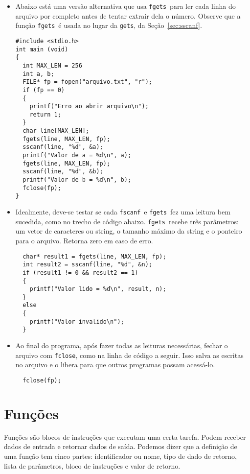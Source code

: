 \documentclass{book}
\newcommand{\FSCANF}{{\tt fscanf}}
\newcommand{\GETS}{{\tt gets}}
\newcommand{\FGETS}{{\tt fgets}}
\newcommand{\FCLOSE}{{\tt fclose}}
\begin{document}
\begin{itemize}
\item Abaixo está uma versão alternativa que usa \FGETS\ para ler cada linha do arquivo por completo antes de tentar extrair dela o número. Observe que a função \FGETS\ é usada no lugar da \GETS, da Seção~\ref{sec:sscanf}. \

\begin{lstlisting}
#include <stdio.h> 
int main (void)
{
  int MAX_LEN = 256
  int a, b;
  FILE* fp = fopen("arquivo.txt", "r");
  if (fp == 0)
  {
    printf("Erro ao abrir arquivo\n");
    return 1;
  }
  char line[MAX_LEN];
  fgets(line, MAX_LEN, fp);
  sscanf(line, "%d", &a);
  printf("Valor de a = %d\n", a);
  fgets(line, MAX_LEN, fp);
  sscanf(line, "%d", &b);
  printf("Valor de b = %d\n", b);
  fclose(fp);
}
\end{lstlisting}


\item Idealmente, deve-se testar se cada \FSCANF\ e \FGETS\ fez uma leitura bem sucedida, como no trecho de código abaixo. \FGETS\ recebe três parâmetros: um vetor de caracteres ou string, o tamanho máximo da string e o ponteiro para o arquivo. Retorna zero em caso de erro.

\begin{lstlisting}
  char* result1 = fgets(line, MAX_LEN, fp);
  int result2 = sscanf(line, "%d", &n);
  if (result1 != 0 && result2 == 1)
  {
    printf("Valor lido = %d\n", result, n);
  }
  else
  {
    printf("Valor invalido\n");
  }
\end{lstlisting}

\item Ao final do programa, após fazer todas as leituras necessárias, fechar o arquivo com \FCLOSE, como na linha de código a seguir. Isso salva as escritas no arquivo e o libera para que outros programas possam acessá-lo.

\begin{lstlisting}
  fclose(fp);
\end{lstlisting}

\end{itemize}



\chapter{Funções}

Funções são blocos de instruções que executam uma certa tarefa. 
Podem receber dados de entrada e retornar dados de saída. 
Podemos dizer que a definição de uma função tem cinco partes: identificador ou nome, tipo de dado de retorno, lista de parâmetros, bloco de instruções e valor de retorno.
\end{document}
